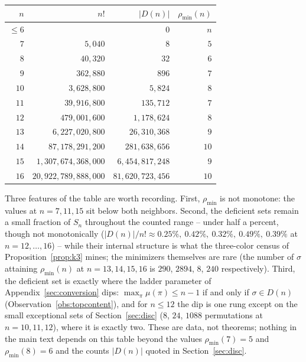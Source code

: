 \documentclass[11pt]{article}
\theoremstyle{definition}
\newcommand{\pmin}{\rho_{\min}}
\begin{document}
\begin{center}
\begin{tabular}{rrrr}
\toprule
$n$ & $n!$ & $|D(n)|$ & $\pmin(n)$ \\
\midrule
$\le 6$ &  & $0$ & $n$ \\
$7$  & $5{,}040$         & $8$             & $5$ \\
$8$  & $40{,}320$        & $32$            & $6$ \\
$9$  & $362{,}880$       & $896$           & $7$ \\
$10$ & $3{,}628{,}800$   & $5{,}824$       & $8$ \\
$11$ & $39{,}916{,}800$  & $135{,}712$     & $7$ \\
$12$ & $479{,}001{,}600$ & $1{,}178{,}624$ & $8$ \\
$13$ & $6{,}227{,}020{,}800$      & $26{,}310{,}368$ & $9$ \\
$14$ & $87{,}178{,}291{,}200$     & $281{,}638{,}656$ & $10$ \\
$15$ & $1{,}307{,}674{,}368{,}000$  & $6{,}454{,}817{,}248$ & $9$ \\
$16$ & $20{,}922{,}789{,}888{,}000$ & $81{,}620{,}723{,}456$ & $10$ \\
\bottomrule
\end{tabular}
\end{center}

Three features of the table are worth recording. First, $\pmin$ is not monotone:
the values at $n = 7, 11, 15$ sit below both neighbors. Second, the deficient
sets remain a small fraction of $S_n$ throughout the counted range -- under
half a percent, though not monotonically ($|D(n)|/n! \approx 0.25\%,\ 0.42\%,\
0.32\%,\ 0.49\%,\ 0.39\%$ at $n = 12, \dots, 16$) -- while their internal
structure is what the three-color census of Proposition~\ref{prop:k3} mines;
the minimizers themselves are rare (the number of $\sigma$ attaining
$\pmin(n)$ at $n = 13, 14, 15, 16$ is $290$, $2894$, $8$, $240$ respectively).
Third, the deficient set is exactly where the ladder parameter of
Appendix~\ref{sec:conversion} dips: $\max_\pi \mu(\pi) \le n-1$ if and only if
$\sigma \in D(n)$ (Observation~\ref{obs:topcontent}), and for $n \le 12$ the dip
is one rung except on the small exceptional sets of Section~\ref{sec:disc}
($8$, $24$, $1088$ permutations at $n = 10, 11, 12$), where it is exactly two.
These are data, not theorems; nothing in the main text depends on this table
beyond the values $\pmin(7) = 5$ and $\pmin(8) = 6$ and the counts $|D(n)|$
quoted in Section~\ref{sec:disc}.
\end{document}
